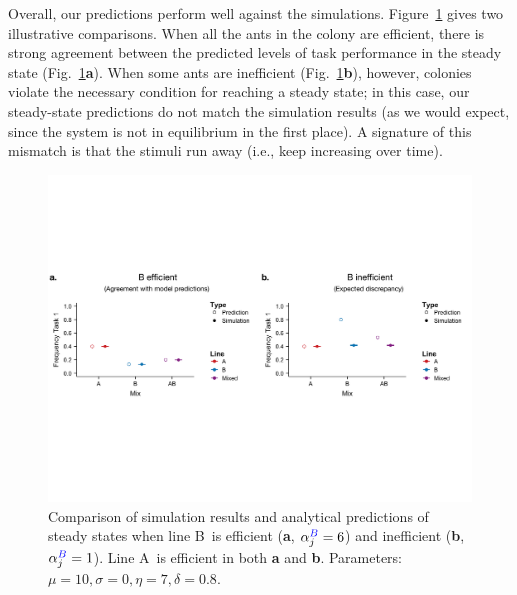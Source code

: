 \documentclass[11pt]{article}
\newcommand{\A}{{\color{red}A}}
\newcommand{\B}{{\color{blue}B}}
\begin{document}
Overall, our predictions perform well against the simulations. Figure~\ref{fig:5050_comp} gives two illustrative comparisons. When all the ants in the colony are efficient, there is strong agreement between the predicted levels of task performance in the steady state (Fig.~\ref{fig:5050_comp}\textbf{a}). When some ants are inefficient (Fig.~\ref{fig:5050_comp}\textbf{b}), however, colonies violate the necessary condition for reaching a steady state; in this case, our steady-state predictions do not match the simulation results (as we would expect, since the system is not in equilibrium in the first place). A signature of this mismatch is that the stimuli run away (i.e., keep increasing over time).
\begin{figure}[H]
    \centering
    \includegraphics[trim={0 2.6in 0 2.4in}, clip, width=1\linewidth]{doc/model_comparison_deltaalpha.pdf}
    \caption{Comparison of simulation results and analytical predictions of steady states when line \B\ is efficient (\textbf{a}, $\alpha_j^{\B} = 6$) and inefficient (\textbf{b}, $\alpha_j^{\B} = 1$). Line \A\ is efficient in both \textbf{a} and \textbf{b}. Parameters: $\mu = 10, \sigma = 0, \eta = 7, \delta = 0.8$. }
    \label{fig:5050_comp}
\end{figure}
\end{document}
